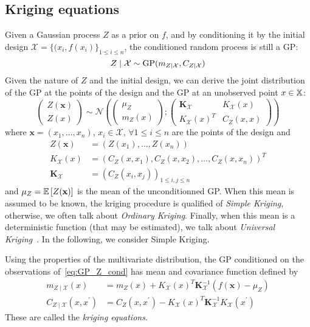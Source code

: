 \documentclass[../../Main_ManuscritThese.tex]{subfiles}
\begin{document}
\subsection{Kriging equations}
\label{sec:krigin_equations}
Given a Gaussian process $Z$ as a prior on $f$, and by conditioning it by the initial design $\mathcal{X} = \{(x_i, f(x_i)\}_{1 \leq i \leq n}$, the conditioned random process is still a GP:
\begin{equation}
  \label{eq:GP_Z_cond}
  Z \mid \mathcal{X} \sim \operatorname{\mathrm{GP}}(m_{Z\mid \mathcal{X}}, C_{Z\mid \mathcal{X}})
\end{equation}
Given the nature of $Z$ and the initial design, we can derive the
joint distribution of the GP at the points of the design and the GP at
an unobserved point $x \in \mathbb{X}$:
\begin{equation}
  \label{eq:GP_joint_distrib}
  \begin{pmatrix}
    Z(\mathbf{x}) \\
    Z(x)
  \end{pmatrix} \sim
  \mathcal{N}\left(
    \begin{pmatrix}
      \mu_Z \\
      m_{Z}(x)
    \end{pmatrix} ;
    \begin{pmatrix}
      \mathbf{K}_{\mathcal{X}} & K_{\mathcal{X}}(x) \\
       K_{\mathcal{X}}(x)^T & C_Z(x, x)
    \end{pmatrix}
\right)
\end{equation}
where $\mathbf{x} = (x_1,\dots,x_n)$, $x_i\in\mathcal{X}$, $\forall 1\leq i\leq n$ are the points of the design and
\begin{align}
   Z(\mathbf{x}) &= (Z({x}_1),\dots,Z({x}_n)) \\
  K_{\mathcal{X}}(x) &= \left(C_Z(x, x_1),C_Z(x, x_2),\dots,C_Z(x,x_n)\right)^T \\
  \mathbf{K}_{\mathcal{X}} &= \left(C_Z(x_i, x_j)\right)_{1 \leq i,j \leq n}
\end{align}
and $\mu_Z = \mathbb{E}\left[Z(\mathbf{x})\right]$ is the mean of the
unconditionned GP. When this mean is assumed to be known, the kriging
procedure is qualified of \emph{Simple Kriging}, otherwise, we often
talk about \emph{Ordinary Kriging}. Finally, when this mean is a
deterministic function (that may be estimated), we talk about
\emph{Universal Kriging}~\cite{le_riche_introduction_2014}. In the
following, we consider Simple Kriging.

Using the properties of the multivariate distribution, the GP conditioned on the observations of~\eqref{eq:GP_Z_cond} has mean and covariance function defined by
\begin{align}
  m_{Z \mid \mathcal{X}}(x) &= m_Z(x) + K_{\mathcal{X}}(x)^T \mathbf{K}_{\mathcal{X}}^{-1}(f(\mathbf{x}) - \mu_Z ) \\
  C_{Z\mid \mathcal{X}}(x, x^\prime) &= C_Z(x, x^\prime)  - K_{\mathcal{X}}(x)^T\mathbf{K}_{\mathcal{X}}^{-1}K_{\mathcal{X}}(x^\prime)
\end{align}
These are called the \emph{kriging equations}.
\end{document}
